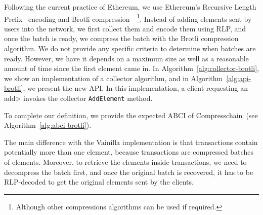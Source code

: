Following the current practice of Ethereum, we use Ethereum's Recursive Length
Prefix~\cite{ethereum} encoding and Brotli
compression~\cite{brotli.compressor}~\footnote{ Although other compressions
algorithms can be used if required.}.
%
%
Instead of adding elements sent by users into the network, we first collect them
and encode them using RLP, and once the batch is ready, we compress the batch
with the Brotli compression algorithm.
%
We do not provide any specific criteria to determine when batches are ready.
%
However, we have it depends on a maximum size as well as a reasonable amount of
time since the first element came in.
%
In Algorithm~\ref{alg:collector-brotli}, we show an implementation of a
collector algorithm, and in Algorithm~\ref{alg:api-brotli}, we present the new
\setchain API.
%
In this implementation, a client requesting an \<add> invokes the
collector \texttt{AddElement} method.
%





%


%
To complete our definition, we provide the expected ABCI of Compresschain~(see
Algorithm~\ref{alg:abci-brotli}).
%

%


The main difference with the Vainilla implementation is that transactions
contain potentially more than one element, because transactions are 
compressed batches of elements.
%
Moreover, to retrieve the elements inside transactions, we need to decompress
the batch first, and once the original batch is recovered, it has to be
RLP-decoded to get the original elements sent by the clients.
%

